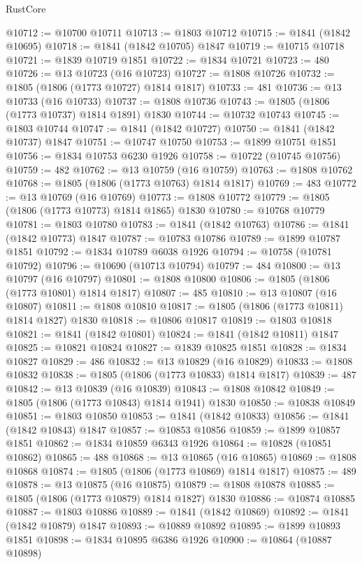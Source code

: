 \begin{lexlean}{RustCore}
\begin{coremodule}
@10712 := @10700 @10711
@10713 := @1803 @10712
@10715 := @1841 (@1842 @10695)
@10718 := @1841 (@1842 @10705) @1847
@10719 := @10715 @10718
@10721 := @1839 @10719 @1851
@10722 := @1834 @10721
@10723 := 480
@10726 := @13 @10723 (@16 @10723)
@10727 := @1808 @10726
@10732 := @1805 (@1806 (@1773 @10727) @1814 @1817)
@10733 := 481
@10736 := @13 @10733 (@16 @10733)
@10737 := @1808 @10736
@10743 := @1805 (@1806 (@1773 @10737) @1814 @1891) @1830
@10744 := @10732 @10743
@10745 := @1803 @10744
@10747 := @1841 (@1842 @10727)
@10750 := @1841 (@1842 @10737) @1847
@10751 := @10747 @10750
@10753 := @1899 @10751 @1851
@10756 := @1834 @10753 @6230 @1926
@10758 := @10722 (@10745 @10756)
@10759 := 482
@10762 := @13 @10759 (@16 @10759)
@10763 := @1808 @10762
@10768 := @1805 (@1806 (@1773 @10763) @1814 @1817)
@10769 := 483
@10772 := @13 @10769 (@16 @10769)
@10773 := @1808 @10772
@10779 := @1805 (@1806 (@1773 @10773) @1814 @1865) @1830
@10780 := @10768 @10779
@10781 := @1803 @10780
@10783 := @1841 (@1842 @10763)
@10786 := @1841 (@1842 @10773) @1847
@10787 := @10783 @10786
@10789 := @1899 @10787 @1851
@10792 := @1834 @10789 @6038 @1926
@10794 := @10758 (@10781 @10792)
@10796 := @10690 (@10713 @10794)
@10797 := 484
@10800 := @13 @10797 (@16 @10797)
@10801 := @1808 @10800
@10806 := @1805 (@1806 (@1773 @10801) @1814 @1817)
@10807 := 485
@10810 := @13 @10807 (@16 @10807)
@10811 := @1808 @10810
@10817 := @1805 (@1806 (@1773 @10811) @1814 @1827) @1830
@10818 := @10806 @10817
@10819 := @1803 @10818
@10821 := @1841 (@1842 @10801)
@10824 := @1841 (@1842 @10811) @1847
@10825 := @10821 @10824
@10827 := @1839 @10825 @1851
@10828 := @1834 @10827
@10829 := 486
@10832 := @13 @10829 (@16 @10829)
@10833 := @1808 @10832
@10838 := @1805 (@1806 (@1773 @10833) @1814 @1817)
@10839 := 487
@10842 := @13 @10839 (@16 @10839)
@10843 := @1808 @10842
@10849 := @1805 (@1806 (@1773 @10843) @1814 @1941) @1830
@10850 := @10838 @10849
@10851 := @1803 @10850
@10853 := @1841 (@1842 @10833)
@10856 := @1841 (@1842 @10843) @1847
@10857 := @10853 @10856
@10859 := @1899 @10857 @1851
@10862 := @1834 @10859 @6343 @1926
@10864 := @10828 (@10851 @10862)
@10865 := 488
@10868 := @13 @10865 (@16 @10865)
@10869 := @1808 @10868
@10874 := @1805 (@1806 (@1773 @10869) @1814 @1817)
@10875 := 489
@10878 := @13 @10875 (@16 @10875)
@10879 := @1808 @10878
@10885 := @1805 (@1806 (@1773 @10879) @1814 @1827) @1830
@10886 := @10874 @10885
@10887 := @1803 @10886
@10889 := @1841 (@1842 @10869)
@10892 := @1841 (@1842 @10879) @1847
@10893 := @10889 @10892
@10895 := @1899 @10893 @1851
@10898 := @1834 @10895 @6386 @1926
@10900 := @10864 (@10887 @10898)

\end{coremodule}
\end{lexlean}
